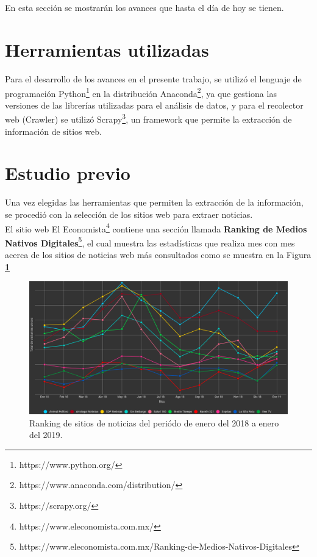\ \\\\
En esta sección se mostrarán los avances que hasta el día de hoy se tienen.

\section{Herramientas utilizadas}
Para el desarrollo de los avances en el presente trabajo, se utilizó el lenguaje de programación Python\footnote{https://www.python.org/} 
en la distribución Anaconda\footnote{https://www.anaconda.com/distribution/}, ya que gestiona las 
versiones de las librerías utilizadas para el análisis de datos, y para el recolector web (Crawler) se utilizó Scrapy\footnote{https://scrapy.org/}, 
un framework que permite la extracción de información de sitios web.

\section{Estudio previo}
Una vez elegidas las herramientas que permiten la extracción de la información, se procedió con la selección de los 
sitios web para extraer noticias.
\\
El sitio web El Economista\footnote{https://www.eleconomista.com.mx/} contiene una sección llamada 
\textbf{Ranking de Medios Nativos Digitales}\footnote{https://www.eleconomista.com.mx/Ranking-de-Medios-Nativos-Digitales}, 
el cual muestra las estadísticas que realiza mes con mes acerca de los sitios de noticias web más consultados como se muestra 
en la Figura \textbf{\ref{fig:rank}}
\begin{figure}[H]
  \centering
  \includegraphics[scale=.28]{imagenes/Capitulo5/ranking}
  \caption{Ranking de sitios de noticias del periódo de enero del 2018 a enero del 2019.}
  \label{fig:rank}
\end{figure}

